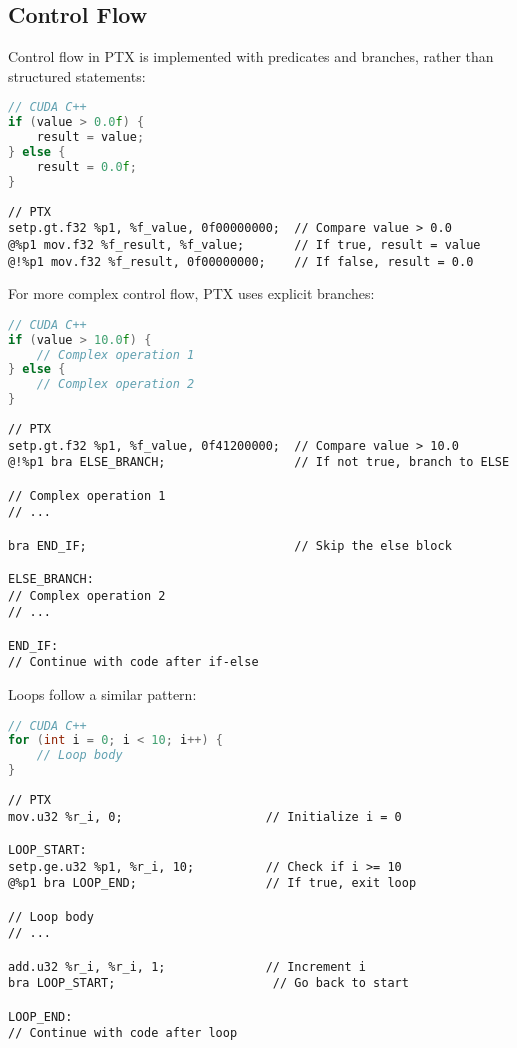 \subsection{Control Flow}

Control flow in PTX is implemented with predicates and branches, rather than structured statements:

\begin{lstlisting}[language=C++]
// CUDA C++
if (value > 0.0f) {
    result = value;
} else {
    result = 0.0f;
}
\end{lstlisting}

\begin{lstlisting}[style=ptx]
// PTX
setp.gt.f32 %p1, %f_value, 0f00000000;  // Compare value > 0.0
@%p1 mov.f32 %f_result, %f_value;       // If true, result = value
@!%p1 mov.f32 %f_result, 0f00000000;    // If false, result = 0.0
\end{lstlisting}

For more complex control flow, PTX uses explicit branches:

\begin{lstlisting}[language=C++]
// CUDA C++
if (value > 10.0f) {
    // Complex operation 1
} else {
    // Complex operation 2
}
\end{lstlisting}

\begin{lstlisting}[style=ptx]
// PTX
setp.gt.f32 %p1, %f_value, 0f41200000;  // Compare value > 10.0
@!%p1 bra ELSE_BRANCH;                  // If not true, branch to ELSE

// Complex operation 1
// ...

bra END_IF;                             // Skip the else block

ELSE_BRANCH:
// Complex operation 2
// ...

END_IF:
// Continue with code after if-else
\end{lstlisting}

Loops follow a similar pattern:

\begin{lstlisting}[language=C++]
// CUDA C++
for (int i = 0; i < 10; i++) {
    // Loop body
}
\end{lstlisting}

\begin{lstlisting}[style=ptx]
// PTX
mov.u32 %r_i, 0;                    // Initialize i = 0

LOOP_START:
setp.ge.u32 %p1, %r_i, 10;          // Check if i >= 10
@%p1 bra LOOP_END;                  // If true, exit loop

// Loop body
// ...

add.u32 %r_i, %r_i, 1;              // Increment i
bra LOOP_START;                      // Go back to start

LOOP_END:
// Continue with code after loop
\end{lstlisting}

